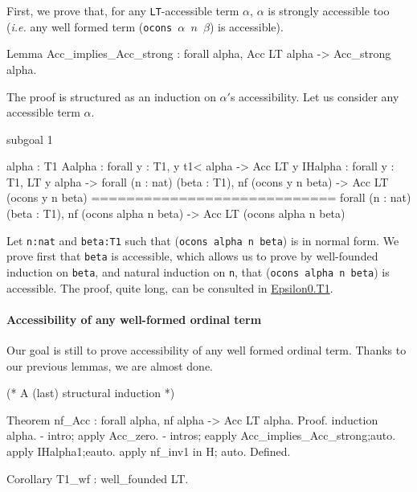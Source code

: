 First, we prove that, for  any \texttt{LT}-accessible term $\alpha$, $\alpha$ is 
strongly accessible too (\emph{i.e.} any well formed
term (\texttt{ocons $\alpha$ $n$ $\beta$})  is accessible).

\begin{Coqsrc}
Lemma Acc_implies_Acc_strong : 
   forall alpha, Acc LT  alpha -> Acc_strong alpha.
\end{Coqsrc}


The proof is structured as an induction on $\alpha'$s accessibility. Let us consider
any  accessible term $\alpha$.



\begin{Coqanswer}
  subgoal 1 

  alpha : T1
  Aalpha : forall y : T1,  y t1< alpha -> Acc LT y
  IHalpha : forall y : T1,
       LT y alpha ->
       forall (n : nat) (beta : T1),
       nf (ocons y n beta) -> Acc LT (ocons y n beta)
  ============================
   forall (n : nat) (beta : T1),
   nf (ocons alpha n beta) -> Acc LT (ocons alpha n beta)
\end{Coqanswer}

Let \texttt{n:nat} and \texttt{beta:T1} such that (\texttt{ocons alpha n beta}) is in normal form. 
We prove first that \texttt{beta} is accessible,  which allows us to prove by well-founded induction on \texttt{beta}, 
and natural induction on \texttt{n}, that (\texttt{ocons alpha n beta}) is accessible.
The proof, quite long, can be consulted in \href{../theories/html/hydras.Epsilon0.T1.html}{Epsilon0.T1}.

\paragraph{Accessibility of any well-formed ordinal term}
\label{sec:orgheadline80}

Our goal is still to prove accessibility of any well formed ordinal term.
Thanks to our previous lemmas, we are almost done.

\begin{Coqsrc}
(* A (last) structural induction *)

Theorem nf_Acc : forall alpha, nf alpha -> Acc LT  alpha.
Proof.
 induction alpha.
-  intro; apply Acc_zero.
 -  intros; eapply Acc_implies_Acc_strong;auto.
    apply IHalpha1;eauto.
    apply nf_inv1 in H; auto. 
Defined.

Corollary T1_wf : well_founded LT.
\end{Coqsrc}

